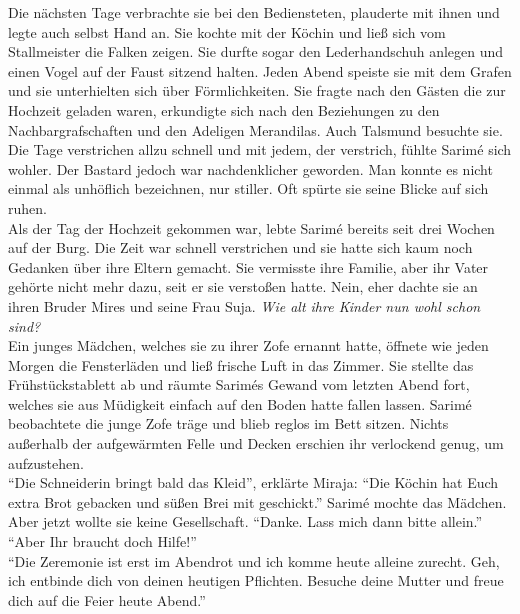 Die nächsten Tage verbrachte sie bei den Bediensteten, plauderte mit ihnen und legte auch selbst 
Hand an. Sie kochte mit der Köchin und ließ sich vom Stallmeister die Falken zeigen. Sie durfte 
sogar den Lederhandschuh anlegen und einen Vogel auf der Faust sitzend halten. Jeden Abend speiste 
sie mit dem Grafen und sie unterhielten sich über Förmlichkeiten. Sie fragte nach den Gästen die 
zur Hochzeit geladen waren, erkundigte sich nach den Beziehungen zu den Nachbargrafschaften und den 
Adeligen Merandilas. Auch Talsmund besuchte sie. Die Tage verstrichen allzu schnell und mit jedem, 
der verstrich, fühlte Sarimé sich wohler. Der Bastard jedoch war nachdenklicher geworden. Man 
konnte es nicht einmal als unhöflich bezeichnen, nur stiller. Oft spürte sie seine Blicke auf sich 
ruhen.\\
Als der Tag der Hochzeit gekommen war, lebte Sarimé bereits seit drei Wochen auf der Burg. Die Zeit 
war schnell verstrichen und sie hatte sich kaum noch Gedanken über ihre Eltern gemacht. Sie 
vermisste ihre Familie, aber ihr Vater gehörte nicht mehr dazu, seit er sie verstoßen hatte. Nein, 
eher dachte sie an ihren Bruder Mires und seine Frau Suja. \textit{Wie alt ihre Kinder nun wohl 
schon sind?}\\
Ein junges Mädchen, welches sie zu ihrer Zofe ernannt hatte, öffnete wie jeden Morgen die 
Fensterläden und ließ frische Luft in das Zimmer. Sie stellte das Frühstückstablett ab und räumte 
Sarimés Gewand vom letzten Abend fort, welches sie aus Müdigkeit einfach auf den Boden hatte fallen 
lassen. Sarimé beobachtete die junge Zofe träge und blieb reglos im Bett sitzen. Nichts außerhalb 
der aufgewärmten Felle und Decken erschien ihr verlockend genug, um aufzustehen.\\
``Die Schneiderin bringt bald das Kleid'', erklärte Miraja: ``Die Köchin hat Euch extra Brot 
gebacken und süßen Brei mit geschickt.''
Sarimé mochte das Mädchen. Aber jetzt wollte sie keine Gesellschaft. ``Danke. Lass mich dann 
bitte allein.''\\
``Aber Ihr braucht doch Hilfe!''\\
``Die Zeremonie ist erst im Abendrot und ich komme heute alleine zurecht. Geh, ich entbinde dich 
von deinen heutigen Pflichten. Besuche deine Mutter und freue dich auf die Feier heute Abend.''\\

